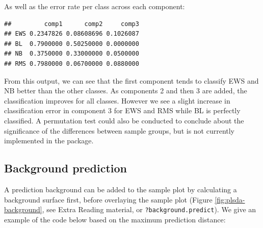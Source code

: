 \documentclass[]{book}
\newenvironment{Shaded}{\begin{snugshade}}{\end{snugshade}}
\newcommand{\KeywordTok}[1]{\textcolor[rgb]{0.13,0.29,0.53}{\textbf{#1}}}
\newcommand{\DataTypeTok}[1]{\textcolor[rgb]{0.13,0.29,0.53}{#1}}
\newcommand{\DecValTok}[1]{\textcolor[rgb]{0.00,0.00,0.81}{#1}}
\newcommand{\StringTok}[1]{\textcolor[rgb]{0.31,0.60,0.02}{#1}}
\newcommand{\OtherTok}[1]{\textcolor[rgb]{0.56,0.35,0.01}{#1}}
\newcommand{\OperatorTok}[1]{\textcolor[rgb]{0.81,0.36,0.00}{\textbf{#1}}}
\newcommand{\NormalTok}[1]{#1}
\begin{document}
As well as the error rate per class across each component:

\begin{Shaded}
\end{Shaded}

\begin{verbatim}
##         comp1      comp2     comp3
## EWS 0.2347826 0.08608696 0.1026087
## BL  0.7900000 0.50250000 0.0000000
## NB  0.3750000 0.33000000 0.0500000
## RMS 0.7980000 0.06700000 0.0880000
\end{verbatim}

From this output, we can see that the first component tends to classify
EWS and NB better than the other classes. As components 2 and then 3 are
added, the classification improves for all classes. However we see a
slight increase in classification error in component 3 for EWS and RMS
while BL is perfectly classified. A permutation test could also be
conducted to conclude about the significance of the differences between
sample groups, but is not currently implemented in the package.

\subsection{Background prediction}\label{ex:plsda:background}

A prediction background can be added to the sample plot by calculating a
background surface first, before overlaying the sample plot (Figure
\ref{fig:plsda-background}, see Extra Reading material, or
\texttt{?background.predict}). We give an example of the code below
based on the maximum prediction distance:

\begin{Shaded}
\end{Shaded}
\end{document}
